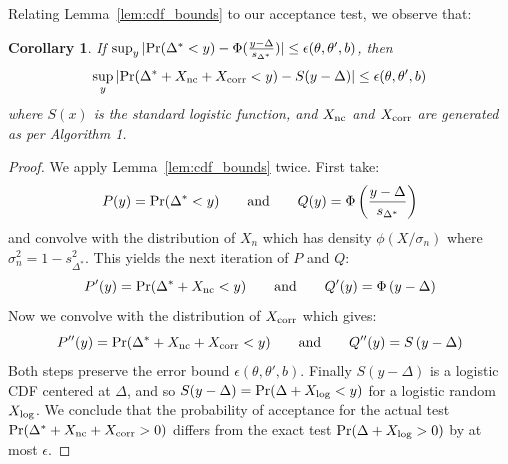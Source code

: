 \documentclass{article}
\newtheorem{corollary}{Corollary}
\begin{document}


Relating Lemma~\ref{lem:cdf_bounds} to our acceptance test, we observe that:

\begin{corollary}\label{cor:bounds_preserved}
If $\sup_y|{\rm Pr}(\Delta^* < y) - \Phi(\frac{y-\Delta}{s_{\Delta^*}})|
\leq \epsilon(\theta,\theta',b)$, then
\begin{equation}
    \sup_y|{\rm Pr}(\Delta^*+X_{\rm nc}+X_{\rm corr} < y) - S(y-\Delta)| \leq \epsilon(\theta,\theta',b)
\end{equation}
where $S(x)$ is the standard logistic function, and $X_{\rm nc}$ and $X_{\rm corr}$ are generated as per Algorithm 1. 
\end{corollary}

\begin{proof}
We apply Lemma~\ref{lem:cdf_bounds} twice. First take:
\begin{equation}
    P(y) = {\rm Pr}(\Delta^* < y) \qquad {\rm and}\qquad Q(y) = \Phi\left(\frac{y-\Delta}{s_{\Delta^*}}\right)
\end{equation}
and convolve with the distribution of $X_n$ which has density $\phi(X/\sigma_n)$
where $\sigma_n^2 = 1 - s^2_{\Delta^*}$. This yields the next iteration of $P$
and $Q$:
\begin{equation}
    P'(y) = {\rm Pr}(\Delta^*+X_{\rm nc} < y) \qquad {\rm and}\qquad Q'(y) = \Phi\left({y-\Delta}\right)
\end{equation}
Now we convolve with the distribution of $X_{\rm corr}$ which gives:
\begin{equation}
    P''(y) = {\rm Pr}(\Delta^*+X_{\rm nc}+X_{\rm corr} < y) \qquad {\rm and}\qquad Q''(y) = S\left({y-\Delta}\right)
\end{equation}
Both steps preserve the error bound $\epsilon(\theta,\theta',b)$. Finally
$S(y-\Delta)$ is a logistic CDF centered at $\Delta$, and so $S(y-\Delta) = {\rm
Pr}(\Delta + X_{\rm log} < y)$ for a logistic random $X_{\rm log}$. We conclude
that the probability of acceptance for the actual test ${\rm Pr}(\Delta^*+X_{\rm
nc}+X_{\rm corr} > 0)$ differs from the exact test ${\rm Pr}(\Delta+X_{\rm
log} > 0)$ by at most $\epsilon$.
\end{proof}
\end{document}
